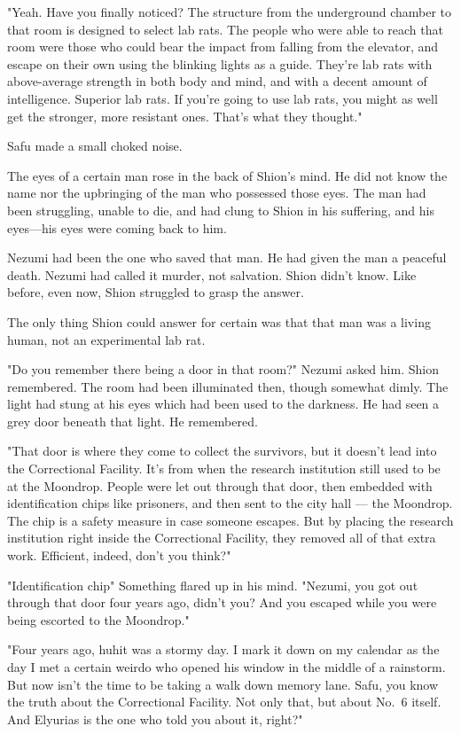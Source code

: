 "Yeah. Have you finally noticed? The structure from the underground
chamber to that room is designed to select lab rats. The people who were
able to reach that room were those who could bear the impact from
falling from the elevator, and escape on their own using the blinking
lights as a guide. They're lab rats with above-average strength in both
body and mind, and with a decent amount of intelligence. Superior lab
rats. If you're going to use lab rats, you might as well get the
stronger, more resistant ones. That's what they thought."

Safu made a small choked noise.

The eyes of a certain man rose in the back of Shion's mind. He did not
know the name nor the upbringing of the man who possessed those eyes.
The man had been struggling, unable to die, and had clung to Shion in
his suffering, and his eyes---his eyes were coming back to him.

Nezumi had been the one who saved that man. He had given the man a
peaceful death. Nezumi had called it murder, not salvation. Shion didn't
know. Like before, even now, Shion struggled to grasp the answer.

The only thing Shion could answer for certain was that that man was a
living human, not an experimental lab rat.

"Do you remember there being a door in that room?" Nezumi asked him.
Shion remembered. The room had been illuminated then, though somewhat
dimly. The light had stung at his eyes which had been used to the
darkness. He had seen a grey door beneath that light. He remembered.

"That door is where they come to collect the survivors, but it doesn't
lead into the Correctional Facility. It's from when the research
institution still used to be at the Moondrop. People were let out
through that door, then embedded with identification chips like
prisoners, and then sent to the city hall --- the Moondrop. The chip is a
safety measure in case someone escapes. But by placing the research
institution right inside the Correctional Facility, they removed all of
that extra work. Efficient, indeed, don't you think?"

"Identification chip\el " Something flared up in his mind. "Nezumi, you
got out through that door four years ago, didn't you? And you escaped
while you were being escorted to the Moondrop."

"Four years ago, huh\el it was a stormy day. I mark it down on my
calendar as the day I met a certain weirdo who opened his window in the
middle of a rainstorm. But now isn't the time to be taking a walk down
memory lane. Safu, you know the truth about the Correctional Facility.
Not only that, but about No.~6 itself. And Elyurias is the one who told
you about it, right?"

